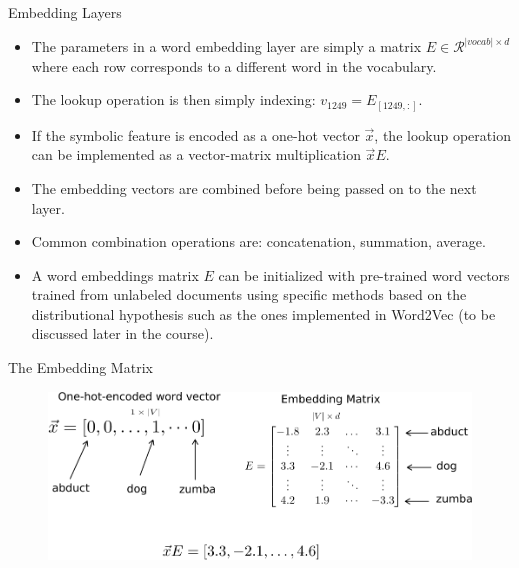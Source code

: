 \documentclass[handout]{beamer}
\begin{document}
\begin{frame}{Embedding Layers}
\begin{scriptsize}
\begin{itemize}

\item The parameters in a word embedding layer are simply a matrix $E \in \mathcal{R}^{|vocab|\times d}$ where each row corresponds to a different word in the vocabulary.

\item The lookup operation is then simply indexing: $v_{1249} = E_{[1249,:]}$.

\item If the symbolic feature is encoded as a one-hot vector $\vec{x}$, the lookup operation can be implemented as a vector-matrix multiplication $\vec{x}E$.

\item The embedding vectors are combined before being passed on to the next layer.

\item Common combination operations are: concatenation, summation, average. 

\item A word embeddings matrix $E$ can be initialized with pre-trained word vectors trained from unlabeled documents using specific methods based on the distributional hypothesis such as the ones implemented in Word2Vec (to be discussed later in the course).


\end{itemize}
\end{scriptsize}
\end{frame}



\begin{frame}{The Embedding Matrix}
\begin{figure}[htb]
	\centering
	 \includegraphics[scale=0.65]{pics/emb_matrix.pdf}
\end{figure}
\end{frame}
\end{document}

